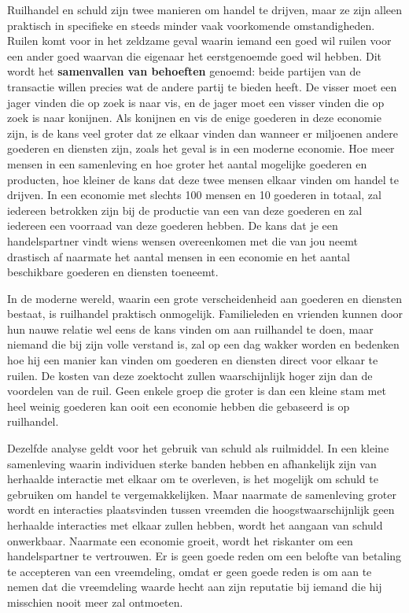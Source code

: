 \documentclass[
  a5paper,
  smalldemyvopaper,11pt,twoside,onecolumn,openright,extrafontsizes,
hidelinks]{memoir}
\begin{document}
Ruilhandel en schuld zijn twee manieren om handel te drijven, maar ze
zijn alleen praktisch in specifieke en steeds minder vaak voorkomende
omstandigheden. Ruilen komt voor in het zeldzame geval waarin iemand een
goed wil ruilen voor een ander goed waarvan die eigenaar het
eerstgenoemde goed wil hebben. Dit wordt het \textbf{samenvallen van
behoeften} genoemd: beide partijen van de transactie willen precies wat
de andere partij te bieden heeft. De visser moet een jager vinden die op
zoek is naar vis, en de jager moet een visser vinden die op zoek is naar
konijnen. Als konijnen en vis de enige goederen in deze economie zijn,
is de kans veel groter dat ze elkaar vinden dan wanneer er miljoenen
andere goederen en diensten zijn, zoals het geval is in een moderne
economie. Hoe meer mensen in een samenleving en hoe groter het aantal
mogelijke goederen en producten, hoe kleiner de kans dat deze twee
mensen elkaar vinden om handel te drijven. In een economie met slechts
100 mensen en 10 goederen in totaal, zal iedereen betrokken zijn bij de
productie van een van deze goederen en zal iedereen een voorraad van
deze goederen hebben. De kans dat je een handelspartner vindt wiens
wensen overeenkomen met die van jou neemt drastisch af naarmate het
aantal mensen in een economie en het aantal beschikbare goederen en
diensten toeneemt.

In de moderne wereld, waarin een grote verscheidenheid aan goederen en
diensten bestaat, is ruilhandel praktisch onmogelijk. Familieleden en
vrienden kunnen door hun nauwe relatie wel eens de kans vinden om aan
ruilhandel te doen, maar niemand die bij zijn volle verstand is, zal op
een dag wakker worden en bedenken hoe hij een manier kan vinden om
goederen en diensten direct voor elkaar te ruilen. De kosten van deze
zoektocht zullen waarschijnlijk hoger zijn dan de voordelen van de ruil.
Geen enkele groep die groter is dan een kleine stam met heel weinig
goederen kan ooit een economie hebben die gebaseerd is op ruilhandel.

Dezelfde analyse geldt voor het gebruik van schuld als ruilmiddel. In
een kleine samenleving waarin individuen sterke banden hebben en
afhankelijk zijn van herhaalde interactie met elkaar om te overleven, is
het mogelijk om schuld te gebruiken om handel te vergemakkelijken. Maar
naarmate de samenleving groter wordt en interacties plaatsvinden tussen
vreemden die hoogstwaarschijnlijk geen herhaalde interacties met elkaar
zullen hebben, wordt het aangaan van schuld onwerkbaar. Naarmate een
economie groeit, wordt het riskanter om een handelspartner te
vertrouwen. Er is geen goede reden om een belofte van betaling te
accepteren van een vreemdeling, omdat er geen goede reden is om aan te
nemen dat die vreemdeling waarde hecht aan zijn reputatie bij iemand die
hij misschien nooit meer zal ontmoeten.
\end{document}
